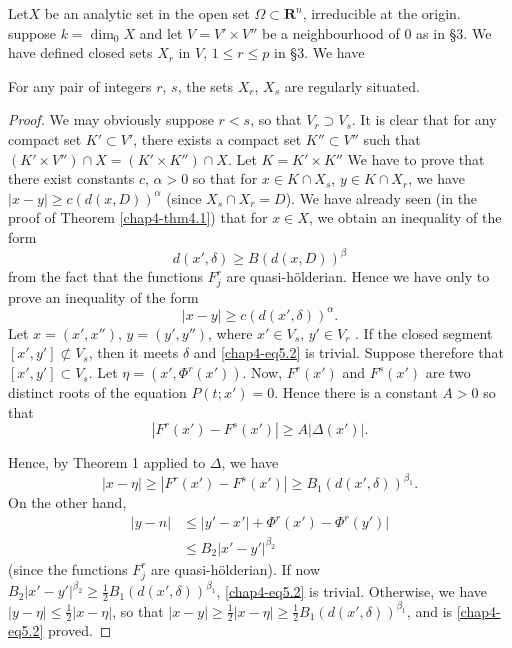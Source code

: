 Let\pageoriginale $X$ be an analytic set in the open set $\Omega \subset \mathbf{R}^n$, irreducible at the origin. suppose $k = \dim_0 X$ and let $V = V' \times V''$ be a neighbourhood of 0 as in \S 3. We have defined closed sets $X_r$ in $V$, $1 \leq r \leq p$ in \S 3. We have

\begin{proposition}\label{chap4-prop5.1}
  For any pair of integers $r$, $s$, the sets $X_r$, $X_s$ are regularly situated. 
\end{proposition}

\begin{proof}
  We may obviously suppose $r <s$, so that $V_r \supset V_s$. It is clear that for any compact set $K' \subset V'$, there exists a compact set $K'' \subset V''$ such that $(K' \times V'') \cap X = (K' \times K'') \cap X$. Let $K = K' \times K''$ We have to prove that there exist constants $c$, $\alpha > 0$ so that for $x \in K \cap X_s$, $y \in K \cap X_r$, we have $|x-y| \geq c (d(x, D))^\alpha$ (since $X_s \cap X_r = D$). We have already seen (in the proof of Theorem \ref{chap4-thm4.1}) that for $x \in X$, we obtain an inequality of the form
  $$
d (x', \delta) \geq B (d(x, D))^\beta
$$
from the fact that the functions $F^r_j$ are quasi-h\"olderian. Hence we have only to prove an inequality of the form
\setcounter{equation}{1}
\begin{equation}
  |x-y| \geq c(d(x', \delta))^\alpha.   \label{chap4-eq5.2}
\end{equation}
Let $ x = (x', x'')$, $y = (y', y'')$, where $x' \in V_s$, $y' \in V_r$ . If the closed segment $[x', y'] \not\subset V_s$, then it meets $\delta$ and \eqref{chap4-eq5.2} is trivial. Suppose therefore that $[x', y'] \subset V_s$. Let $\eta  = (x', \Phi^r (x'))$. Now, $F^r(x')$ and $F^s(x')$ are two distinct roots of the equation $P(t; x') =0$. Hence there is a constant $A>0$ so that
$$
|F^r (x') - F^s (x')| \geq A |\Delta (x')|.
$$

Hence, by Theorem 1 applied to $\Delta$, we have
$$
|x - \eta| \geq |F^r (x') - F^s (x')|  \geq B_1 (d(x', \delta))^{\beta_1}.
$$
On the other hand,
\begin{align*} 
  |y - n | &  \leq |y' - x'| + \Phi^r (x') - \Phi^r (y') |\\
  & \leq B_2 |x' - y'|^{\beta_2} \tag{5.3}\label{chap4-eq5.3}
\end{align*} 
(since the functions $F^r_j$ are quasi-h\"olderian). If now $B_2 |x'- y'|^{\beta_2} \geq \frac{1}{2} B_1 (d (x', \delta))^{\beta_1}$, \eqref{chap4-eq5.2} is trivial. Otherwise, we have $|y - \eta| \leq \frac{1}{2} |x - \eta|$, so that $|x - y| \geq \frac{1}{2} |x - \eta| \geq \frac{1}{2} B_1 (d (x', \delta))^{\beta_1}$, and  is \eqref{chap4-eq5.2} proved.
\end{proof} 

